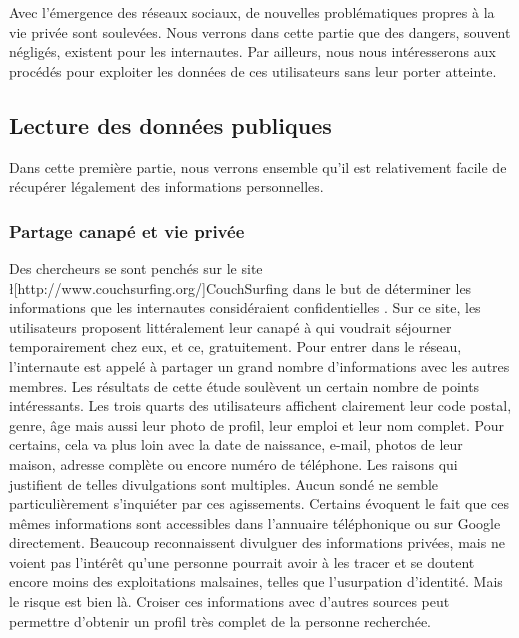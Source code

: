 Avec l'émergence des réseaux sociaux, de nouvelles problématiques propres à la vie privée sont soulevées. Nous verrons dans cette partie que des dangers, souvent négligés, existent pour les internautes. Par ailleurs, nous nous intéresserons aux procédés pour exploiter les données de ces utilisateurs sans leur porter atteinte.

\subsection{Lecture des données publiques}
Dans cette première partie, nous verrons ensemble qu'il est relativement facile de récupérer légalement des informations personnelles.

\subsubsection{Partage canapé et vie privée}
Des chercheurs se sont penchés sur le site \l[http://www.couchsurfing.org/]{CouchSurfing} dans le but de déterminer les informations que les internautes considéraient confidentielles \cite{couchsurfing}. Sur ce site, les utilisateurs proposent littéralement leur canapé à qui voudrait séjourner temporairement chez eux, et ce, gratuitement. Pour entrer dans le réseau, l'internaute est appelé à partager un grand nombre d'informations avec les autres membres. Les résultats de cette étude soulèvent un certain nombre de points intéressants. Les trois quarts des utilisateurs affichent clairement leur code postal, genre, âge mais aussi leur photo de profil, leur emploi et leur nom complet. Pour certains, cela va plus loin avec la date de naissance, e-mail, photos de leur maison, adresse complète ou encore numéro de téléphone.
Les raisons qui justifient de telles divulgations sont multiples. Aucun sondé ne semble particulièrement s'inquiéter par ces agissements. Certains évoquent le fait que ces mêmes informations sont accessibles dans l'annuaire téléphonique ou sur Google directement. Beaucoup reconnaissent divulguer des informations privées, mais ne voient pas l'intérêt qu'une personne pourrait avoir à les tracer et se doutent encore moins des exploitations malsaines, telles que l'usurpation d'identité. Mais le risque est bien là. Croiser ces informations avec d'autres sources peut permettre d'obtenir un profil très complet de la personne recherchée.

